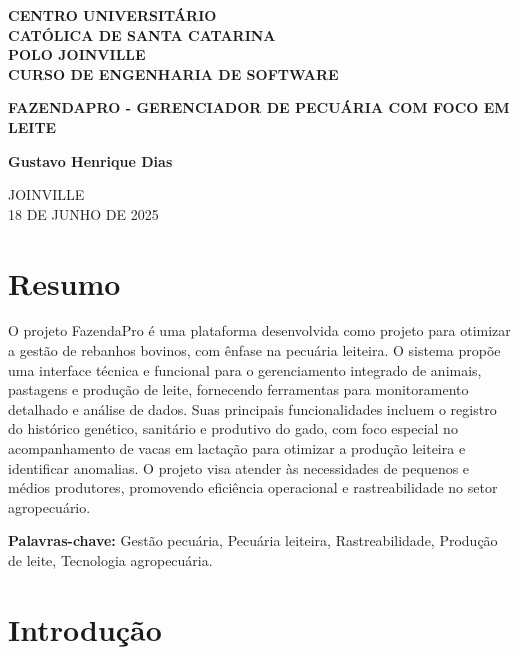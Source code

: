 \documentclass[12pt, a4paper]{article}
\begin{document}
\begin{titlepage}
    \centering
    \vspace*{1cm}
    {\large\bfseries CENTRO UNIVERSITÁRIO\\ CATÓLICA DE SANTA CATARINA\\
    POLO JOINVILLE\\
    CURSO DE ENGENHARIA DE SOFTWARE}\par
    \vspace{2cm}
    {\Large\bfseries FAZENDAPRO - GERENCIADOR DE PECUÁRIA COM FOCO EM LEITE}\par
    \vspace{2cm}
    {\normalsize\bfseries Gustavo Henrique Dias}\par
    \vspace{1cm}
    \vspace{3cm}
    {\normalsize JOINVILLE\\
    18 DE JUNHO DE 2025}\par
\end{titlepage}

\tableofcontents
\newpage

\section*{Resumo}
\begin{spacing}{1.5}
O projeto FazendaPro é uma plataforma desenvolvida como projeto para otimizar a gestão de rebanhos bovinos, com ênfase na pecuária leiteira. O sistema propõe uma interface técnica e funcional para o gerenciamento integrado de animais, pastagens e produção de leite, fornecendo ferramentas para monitoramento detalhado e análise de dados. Suas principais funcionalidades incluem o registro do histórico genético, sanitário e produtivo do gado, com foco especial no acompanhamento de vacas em lactação para otimizar a produção leiteira e identificar anomalias. O projeto visa atender às necessidades de pequenos e médios produtores, promovendo eficiência operacional e rastreabilidade no setor agropecuário.
\end{spacing}
\vspace{0.5cm}
\textbf{Palavras-chave:} Gestão pecuária, Pecuária leiteira, Rastreabilidade, Produção de leite, Tecnologia agropecuária.
\newpage

\section{Introdução}
\end{document}
